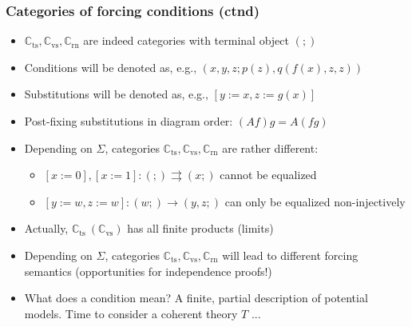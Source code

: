\documentclass[handout,11pt]{beamer}
\newcommand*{\subvs}{_{\mathrm{vs}}}
\newcommand*{\subrn}{_{\mathrm{rn}}}
\newcommand*{\subts}{_{\mathrm{ts}}}
\newcommand{\Cvs}{\mathbb{C}\subvs}
\newcommand{\Crn}{\mathbb{C}\subrn}
\newcommand{\Cts}{\mathbb{C}\subts}
\begin{document}
\begin{frame}
\frametitle{Categories of forcing conditions (ctnd)}
 \begin{itemize}[<+->]   %
    \item $\Cts,\Cvs,\Crn$ are indeed categories with terminal object $(;)$
    \item Conditions will be denoted as, e.g., $(x,y,z;p(z),q(f(x),z,z))$
    \item Substitutions will be denoted as, e.g., $[y:=x,z:=g(x)]$
    \item Post-fixing substitutions in diagram order: $(Af)g = A(fg)$
    \item Depending on $\Sigma$, categories
    $\Cts,\Cvs,\Crn$ are rather different:
     \begin{itemize}
      \item $[x:=0],[x:=1]:(;)\rightrightarrows(x;)$ cannot be equalized    
      \item $[y:=w,z:=w]:(w;)\to(y,z;)$ can only be equalized non-injectively
     \end{itemize}
    \item Actually, $\Cts~(\Cvs)$ has all finite products (limits) 
    \item Depending on $\Sigma$, categories $\Cts,\Cvs,\Crn$ will 
    lead to different forcing semantics 
    (opportunities for independence proofs!)
    \item What does a condition mean? A finite, partial description
    of potential models. Time to consider a coherent theory $T$ ...       
 \end{itemize}
\end{frame}
\end{document}
